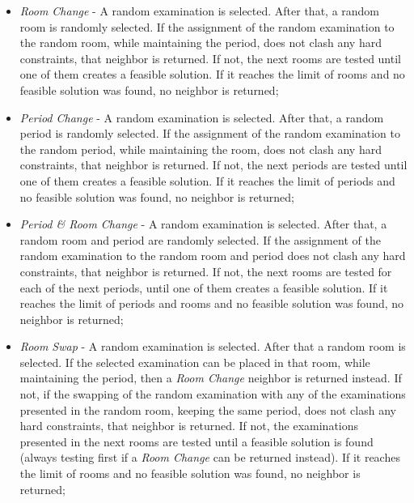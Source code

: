\begin{itemize}
	\item \textit{Room Change} - A random examination is selected. After that, a random room is randomly selected. If the assignment of the random examination to the random room, while maintaining the period, does not clash any hard constraints, that neighbor is returned. If not, the next rooms are tested until one of them creates a feasible solution. If it reaches the limit of rooms and no feasible solution was found, no neighbor is returned;\\
	
	\item \textit{Period Change} - A random examination is selected. After that, a random period is randomly selected. If the assignment of the random examination to the random period, while maintaining the room, does not clash any hard constraints, that neighbor is returned. If not, the next periods are tested until one of them creates a feasible solution. If it reaches the limit of periods and no feasible solution was found, no neighbor is returned;\\
	
	\item \textit{Period \& Room Change} - A random examination is selected. After that, a random room and period are randomly selected. If the assignment of the random examination to the random room and period does not clash any hard constraints, that neighbor is returned. If not, the next rooms are tested for each of the next periods, until one of them creates a feasible solution. If it reaches the limit of periods and rooms and no feasible solution was found, no neighbor is returned;\\
	
	\item \textit{Room Swap} - A random examination is selected. After that a random room is selected. If the selected examination can be placed in that room, while maintaining the period, then a \textit{Room Change} neighbor is returned instead. If not, if the swapping of the random examination with any of the examinations presented in the random room, keeping the same period, does not clash any hard constraints, that neighbor is returned. If not, the examinations presented in the next rooms are tested until a feasible solution is found (always testing first if a \textit{Room Change} can be returned instead). If it reaches the limit of rooms and no feasible solution was found, no neighbor is returned;\\
	

\end{itemize}

